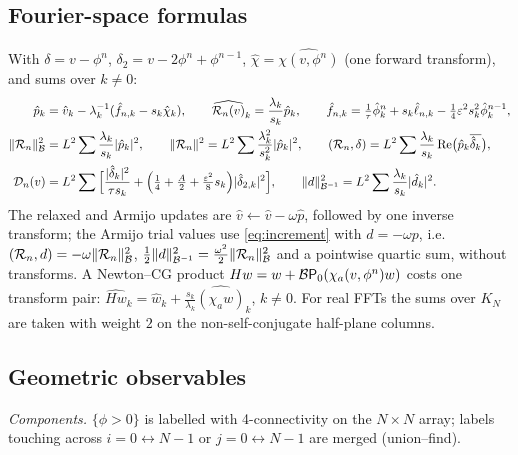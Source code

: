 \subsection{Fourier-space formulas}\label{app:fourier}
With $\delta=v-\phi^n$, $\delta_2=v-2\phi^n+\phi^{n-1}$, $\hat\chi=\widehat{\chi(v,\phi^n)}$ (one forward transform), and sums over $k\ne0$:
\begin{align*}
\hat p_k&=\hat v_k-\lambda_k^{-1}(\hat f_{n,k}-s_k\hat\chi_k),\qquad \widehat{\mathcal{R}_n(v)}_k=\frac{\lambda_k}{s_k}\hat p_k,\qquad \hat f_{n,k}=\tfrac1\tau\hat\phi^n_k+s_k\hat\ell_{n,k}-\tfrac14\varepsilon^2s_k^2\hat\phi^{n-1}_k,\\
\lVert \mathcal{R}_n\rVert_{\mathcal{B}}^2&=L^2\sum\frac{\lambda_k}{s_k}|\hat p_k|^2,\qquad \lVert \mathcal{R}_n\rVert^2=L^2\sum\frac{\lambda_k^2}{s_k^2}|\hat p_k|^2,\qquad (\mathcal{R}_n,\delta)=L^2\sum\frac{\lambda_k}{s_k}\,\mathrm{Re}\big(\hat p_k\overline{\hat\delta_k}\big),\\
\mathcal{D}_n(v)&=L^2\sum\Big[\frac{|\hat\delta_k|^2}{\tau s_k}+\Big(\tfrac14+\tfrac A2+\tfrac{\varepsilon^2}8s_k\Big)|\hat\delta_{2,k}|^2\Big],\qquad \lVert d\rVert_{\mathcal{B}^{-1}}^2=L^2\sum\frac{\lambda_k}{s_k}|\hat d_k|^2 .
\end{align*}
The relaxed and Armijo updates are $\hat v\leftarrow\hat v-\omega\hat p$, followed by one inverse transform; the Armijo trial values use \eqref{eq:increment} with $d=-\omega p$, i.e.\ $(\mathcal{R}_n,d)=-\omega\lVert \mathcal{R}_n\rVert_{\mathcal{B}}^2$, $\frac12\lVert d\rVert_{\mathcal{B}^{-1}}^2=\frac{\omega^2}2\lVert \mathcal{R}_n\rVert_{\mathcal{B}}^2$ and a pointwise quartic sum, without transforms. A Newton--CG product $Hw=w+\mathcal{B}\mathsf{P}_0(\chi_a(v,\phi^n)w)$ costs one transform pair: $\widehat{Hw}_k=\hat w_k+\frac{s_k}{\lambda_k}\widehat{(\chi_aw)}_k$, $k\ne0$. For real FFTs the sums over $K_N$ are taken with weight $2$ on the non-self-conjugate half-plane columns.

\subsection{Geometric observables}\label{app:observables}
\emph{Components.} $\{\phi>0\}$ is labelled with 4-connectivity on the $N\times N$ array; labels touching across $i=0\leftrightarrow N-1$ or $j=0\leftrightarrow N-1$ are merged (union--find).

